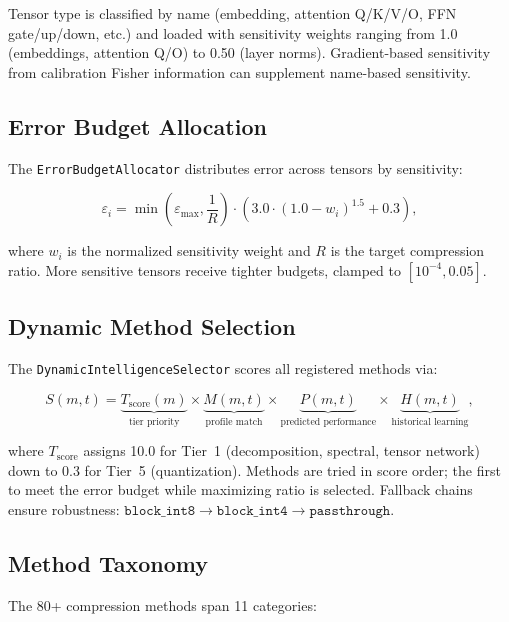\documentclass[11pt,a4paper,twocolumn]{article}
\begin{document}
Tensor type is classified by name (embedding, attention Q/K/V/O, FFN gate/up/down, etc.) and loaded with sensitivity weights ranging from 1.0 (embeddings, attention Q/O) to 0.50 (layer norms). Gradient-based sensitivity from calibration Fisher information can supplement name-based sensitivity.

\subsection{Error Budget Allocation}

The \texttt{ErrorBudgetAllocator} distributes error across tensors by sensitivity:

\begin{equation}
	\label{eq:budget}
	\varepsilon_i = \min\left(\varepsilon_\text{max}, \frac{1}{R}\right) \cdot \left(3.0 \cdot (1.0 - w_i)^{1.5} + 0.3\right),
\end{equation}

where $w_i$ is the normalized sensitivity weight and $R$ is the target compression ratio. More sensitive tensors receive tighter budgets, clamped to $[10^{-4}, 0.05]$.

\subsection{Dynamic Method Selection}

The \texttt{DynamicIntelligenceSelector} scores all registered methods via:

\begin{equation}
	\label{eq:score}
	S(m, t) = \underbrace{T_\text{score}(m)}_{\text{tier priority}} \times \underbrace{M(m, t)}_{\text{profile match}} \times \underbrace{P(m, t)}_{\text{predicted performance}} \times \underbrace{H(m, t)}_{\text{historical learning}},
\end{equation}

where $T_\text{score}$ assigns 10.0 for Tier~1 (decomposition, spectral, tensor network) down to 0.3 for Tier~5 (quantization). Methods are tried in score order; the first to meet the error budget while maximizing ratio is selected. Fallback chains ensure robustness: $\texttt{block\_int8} \to \texttt{block\_int4} \to \texttt{passthrough}$.

\subsection{Method Taxonomy}

The 80+ compression methods span 11 categories:
\end{document}

